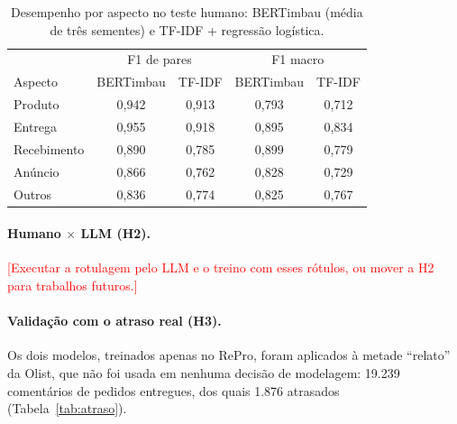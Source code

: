 \documentclass[12pt,a4paper]{article}
\newcommand{\pendente}[1]{\textcolor{red}{[#1]}}
\begin{document}
\begin{table}[ht]
\centering
\caption{Desempenho por aspecto no teste humano: BERTimbau (média de três sementes) e TF-IDF + regressão logística.}
\label{tab:aspectos}
\begin{tabular}{lcccc}
\toprule
 & \multicolumn{2}{c}{F1 de pares} & \multicolumn{2}{c}{F1 macro} \\
Aspecto & BERTimbau & TF-IDF & BERTimbau & TF-IDF \\
\midrule
Produto     & 0,942 & 0,913 & 0,793 & 0,712 \\
Entrega     & 0,955 & 0,918 & 0,895 & 0,834 \\
Recebimento & 0,890 & 0,785 & 0,899 & 0,779 \\
Anúncio     & 0,866 & 0,762 & 0,828 & 0,729 \\
Outros      & 0,836 & 0,774 & 0,825 & 0,767 \\
\bottomrule
\end{tabular}
\end{table}

\paragraph{Humano $\times$ LLM (H2).} \pendente{Executar a rotulagem pelo LLM e o treino com esses rótulos, ou mover a H2 para trabalhos futuros.}

\paragraph{Validação com o atraso real (H3).} Os dois modelos, treinados apenas no RePro, foram aplicados à metade ``relato'' da Olist, que não foi usada em nenhuma decisão de modelagem: 19.239 comentários de pedidos entregues, dos quais 1.876 atrasados (Tabela~\ref{tab:atraso}).
\end{document}
